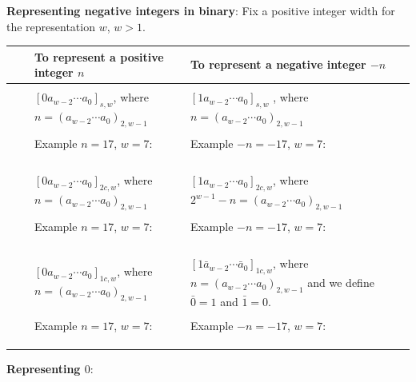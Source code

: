 \documentclass[12pt, oneside]{article}
\begin{document}
{\bf Representing negative integers in binary}: Fix a positive integer  width for the representation  $w$, $w >1$.

\begin{tabular}{|cc|p{3.4in}|p{3.7in}|}
\hline
& & To  represent a positive integer $n$ & To represent a negative integer $-n$\\
\hline
&& &  \\
&\parbox[t]{2mm}{} &
$[ 0a_{w-2} \cdots a_0]_{s,w}$, where $n =  (a_{w-2} \cdots a_0)_{2,w-1}$& 
$[1a_{w-2} \cdots a_0]_{s,w}$
, where $n =  (a_{w-2} \cdots a_0)_{2,w-1}$\\
&& & \\
&& Example $n=17$, $w=7$:  & Example $-n=-17$, $w=7$: \\
&& & \\
&& & \\
&& & \\
\hline
&&  &  \\
&\parbox[t]{2mm}{} &
$[0a_{w-2} \cdots a_0]_{2c,w}$, where $n =  (a_{w-2} \cdots a_0)_{2,w-1}$& $[1a_{w-2} \cdots a_0]_{2c,w}$, where $2^{w-1} - n =  (a_{w-2} \cdots a_0)_{2,w-1}$\\
&& & \\
&& Example $n=17$, $w=7$:  & Example $-n=-17$, $w=7$: \\
&& & \\
&& & \\
&& & \\
\hline
&&  &  \\
\parbox[t]{1.5mm}{} 
& \parbox[t]{2mm}{} &
$[0a_{w-2} \cdots a_0]_{1c,w}$, where $n =  (a_{w-2} \cdots a_0)_{2,w-1}$& $[1\bar{a}_{w-2} \cdots \bar{a}_0]_{1c,w}$, where $n =  (a_{w-2} \cdots a_0)_{2,w-1}$ and we define  $\bar{0} = 1$ and $\bar{1} = 0$.\\
&& & \\
&& Example $n=17$, $w=7$:  & Example $-n=-17$, $w=7$: \\
&& & \\
&& & \\
&& & \\
\hline
\end{tabular}
\vfill

{\bf Representing $0$}:
\end{document}
